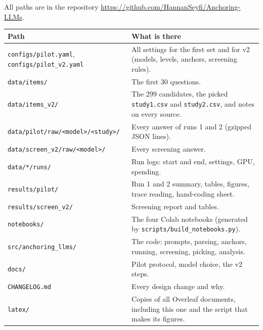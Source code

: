 \documentclass[11pt,a4paper]{article}
\begin{document}
All paths are in the repository \url{https://github.com/HannanSeyfi/Anchoring-LLMs}.

\begin{table}[ht]
\centering\small
\begin{tabularx}{\textwidth}{@{}P{5.9cm}L@{}}
\toprule
\textbf{Path} & \textbf{What is there} \\
\midrule
\texttt{configs/pilot.yaml}, \texttt{configs/pilot\_v2.yaml} & All settings for the first set and for v2 (models, levels, anchors, screening rules). \\
\texttt{data/items/} & The first 30 questions. \\
\texttt{data/items\_v2/} & The 299 candidates, the picked \texttt{study1.csv} and \texttt{study2.csv}, and notes on every source. \\
\texttt{data/pilot/raw/<model>/<study>/} & Every answer of runs 1 and 2 (gzipped JSON lines). \\
\texttt{data/screen\_v2/raw/<model>/} & Every screening answer. \\
\texttt{data/*/runs/} & Run logs: start and end, settings, GPU, spending. \\
\texttt{results/pilot/} & Run 1 and 2 summary, tables, figures, trace reading, hand-coding sheet. \\
\texttt{results/screen\_v2/} & Screening report and tables. \\
\texttt{notebooks/} & The four Colab notebooks (generated by \texttt{scripts/build\_notebooks.py}). \\
\texttt{src/anchoring\_llms/} & The code: prompts, parsing, anchors, running, screening, picking, analysis. \\
\texttt{docs/} & Pilot protocol, model choice, the v2 steps. \\
\texttt{CHANGELOG.md} & Every design change and why. \\
\texttt{latex/} & Copies of all Overleaf documents, including this one and the script that makes its figures. \\
\bottomrule
\end{tabularx}
\end{table}



\end{document}
